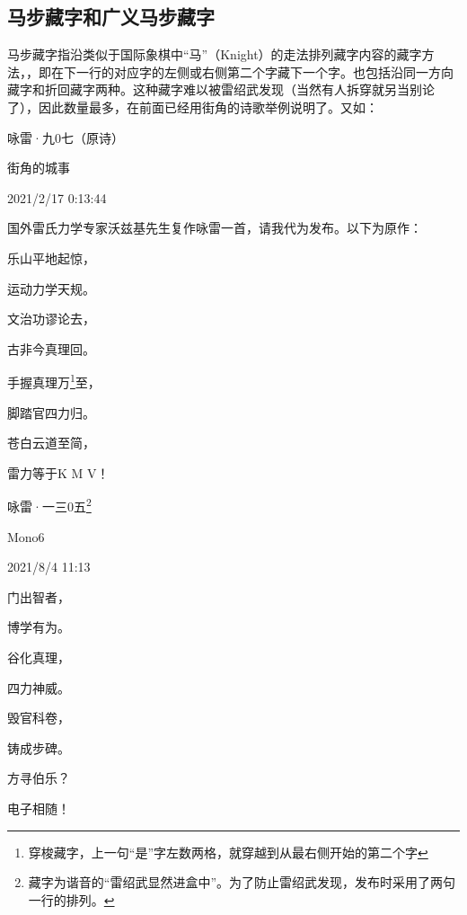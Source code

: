 \documentclass[UTF8,12pt,oneside]{ctexbook}
\begin{document}
        \subsection{马步藏字和广义马步藏字}

        马步藏字指沿类似于国际象棋中“马”（Knight）的走法排列藏字内容的藏字方法，，即在下一行的对应字的左侧或右侧第二个字藏下一个字。也包括沿同一方向藏字和折回藏字两种。这种藏字难以被雷绍武发现（当然有人拆穿就另当别论了），因此数量最多，在前面已经用街角的诗歌举例说明了。又如：

        \begin{center}
            \heiti 咏雷·九0七（原诗）
            
            \songti 街角的城事
            
            2021/2/17 0:13:44
            
            国外雷氏力学专家沃兹基先生复作咏雷一首，请我代为发布。以下为原作：

            \kaishu
            乐山平地起惊，

            运动力学天规。
            
            文治功谬论去，
            
            古非今真理回。
            
            手握真理万\footnote{穿梭藏字，上一句“是”字左数两格，就穿越到从最右侧开始的第二个字}至，
            
            脚踏官四力归。
            
            苍白云道至简，
            
            雷力等于K M V！

        \end{center}

        \newpage

        \begin{center}
            \heiti 咏雷·一三0五\footnote{藏字为谐音的“雷绍武显然进盒中”。为了防止雷绍武发现，发布时采用了两句一行的排列。}
            
            \songti Mono6
            
            2021/8/4 11:13

            \kaishu
            门出智者，
            
            博学有为。
            
            谷化真理，
            
            四力神威。
            
            毁官科卷，
            
            铸成步碑。

            方寻伯乐？
            
            电子相随！

        \end{center}
\end{document}
